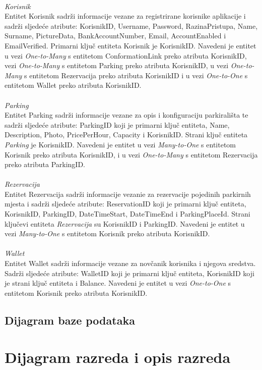 \paragraph{}
{\emph{Korisnik\\}
Entitet Korisnik sadrži informacije vezane za registrirane korisnike aplikacije i sadrži sljedeće atribute:
KorisnikID, Username, Password, RazinaPristupa, Name, Surname, PictureData, BankAccountNumber, Email, AccountEnabled i EmailVerified. 
Primarni ključ entiteta Korisnik je KorisnikID. 
Navedeni je entitet u vezi \emph{One-to-Many} s entitetom ConformationLink preko atributa KorisnikID, 
vezi \emph{One-to-Many} s entitetom Parking preko atributa KorisnikID, 
u vezi \emph{One-to-Many} s entitetom Rezervacija preko atributa KorisnikID 
i u vezi \emph{One-to-One} s entitetom Wallet preko atributa KorisnikID.}

\paragraph{}
{\emph{Parking\\}
Entitet Parking sadrži informacije vezane za opis i konfiguraciju parkirališta te sadrži sljedeće atribute:
ParkingID koji je primarni ključ entiteta, Name, Description, Photo, PricePerHour, Capacity i KorisnikID. Strani ključ entiteta \emph{Parking} je KorisnikID.
Navedeni je entitet u vezi \emph{Many-to-One} s entitetom Korisnik preko atributa KorisnikID, 
i u vezi \emph{One-to-Many} s entitetom Rezervacija preko atributa ParkingID.
}
	
\paragraph{}
{\emph{Rezervacija\\}
Entitet Rezervacija sadrži informacije vezanie za rezervacije pojedinih parkirnih mjesta i sadrži sljedeće atribute:
ReservationID koji je primarni ključ entiteta, KorisnikID, ParkingID, DateTimeStart, DateTimeEnd i ParkingPlaceId. Strani ključevi entiteta \emph{Rezervacija} su KorisnikID i ParkingID.
Navedeni je entitet u vezi \emph{Many-to-One} s entitetom Korisnik preko atributa KorisnikID.
}
	
\paragraph{}
{\emph{Wallet}\\
Entitet Wallet sadrži informacije vezane za novčanik korisnika i njegova sredstva. Sadrži sljedeće atribute:
WalletID koji je primarni ključ entiteta, KorisnikID koji je strani ključ entiteta i Balance.
Navedeni je entitet u vezi \emph{One-to-One} s entitetom Korisnik preko atributa KorisnikID.
}
	


\subsection{Dijagram baze podataka}

\section{Dijagram razreda i opis razreda}


\eject
